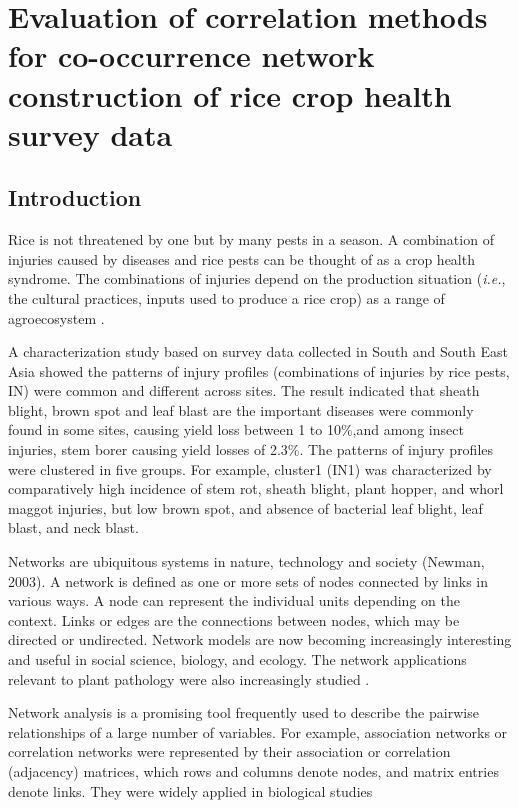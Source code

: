\section{Evaluation of correlation methods for co-occurrence network construction of rice crop health survey data}

\subsection*{Introduction}

Rice is not threatened by one but by many pests in a season. A combination of injuries caused by diseases and rice pests can be thought of as a crop health syndrome. The combinations of injuries depend on the production situation (\textit{i.e.}, the cultural practices, inputs used to produce a rice crop) as a range of agroecosystem \citep{Savary_2006_Quantification}.

A characterization study based on survey data collected in South and South East Asia \citep{Savary_2000_Characterization} showed the patterns of injury profiles (combinations of injuries by rice pests, IN) were common and different across sites. The result indicated that sheath blight, brown spot and leaf blast are the important diseases were commonly found in some sites, causing yield loss between 1 to 10\%,and among insect injuries, stem borer causing yield losses of 2.3\%. The patterns of injury profiles were clustered in five groups. For example, cluster1 (IN1) was characterized by comparatively high incidence of stem rot, sheath blight, plant hopper, and whorl maggot injuries, but low brown spot, and absence of bacterial leaf blight, leaf blast, and neck blast.

Networks are ubiquitous systems in nature, technology and society (Newman, 2003). A network is defined as one or more sets of nodes connected by links in various ways. A node can represent the individual units depending on the context. Links or edges are the connections between nodes, which may be directed or undirected. Network models are now becoming increasingly interesting and useful in social science, biology, and ecology. The network applications relevant to plant pathology were also increasingly studied \citep{Moslonka_Lefebvre_2011}.

Network analysis is a promising tool frequently used to describe the pairwise relationships of a large number of variables. For example, association networks or correlation networks were represented by their association or correlation (adjacency) matrices, which rows and columns denote nodes, and matrix entries denote links. They were widely applied in biological studies \citep{Toubiana_2013_Net,Barabasi_2004_Network}

